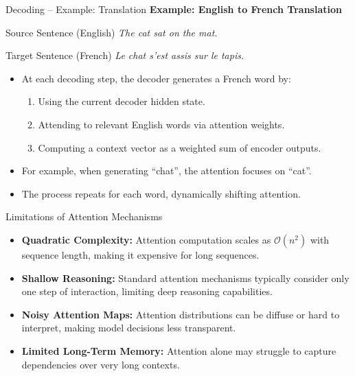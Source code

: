 \begin{frame}{Decoding – Example: Translation}
    \textbf{Example: English to French Translation}

    \begin{block}{Source Sentence (English)}
        \textit{The cat sat on the mat.}
    \end{block}

    \begin{block}{Target Sentence (French)}
        \textit{Le chat s'est assis sur le tapis.}
    \end{block}

    \begin{itemize}
        \item At each decoding step, the decoder generates a French word by:
        \begin{enumerate}
            \item Using the current decoder hidden state.
            \item Attending to relevant English words via attention weights.
            \item Computing a context vector as a weighted sum of encoder outputs.
        \end{enumerate}
        \item For example, when generating ``chat'', the attention focuses on ``cat''.
        \item The process repeats for each word, dynamically shifting attention.
    \end{itemize}
\end{frame}

\begin{frame}{Limitations of Attention Mechanisms}
    \begin{itemize}
        \item \textbf{Quadratic Complexity:} Attention computation scales as $\mathcal{O}(n^2)$ with sequence length, making it expensive for long sequences.
        \item \textbf{Shallow Reasoning:} Standard attention mechanisms typically consider only one step of interaction, limiting deep reasoning capabilities.
        \item \textbf{Noisy Attention Maps:} Attention distributions can be diffuse or hard to interpret, making model decisions less transparent.
        \item \textbf{Limited Long-Term Memory:} Attention alone may struggle to capture dependencies over very long contexts.
    \end{itemize}
\end{frame}

